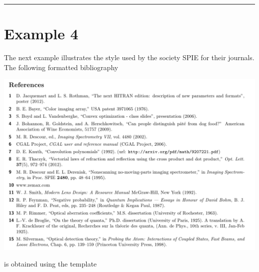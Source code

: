 \documentclass[letterpaper,10pt,english]{sphinxmanual}
\begin{document}
\bigskip\hrule{}\bigskip



\section{Example 4}
\label{examples:example-4}
The next example illustrates the style used by the society SPIE for their journals. The following formatted bibliography

\includegraphics[width=0.600\linewidth]{example4.png}

is obtained using the template
\end{document}

